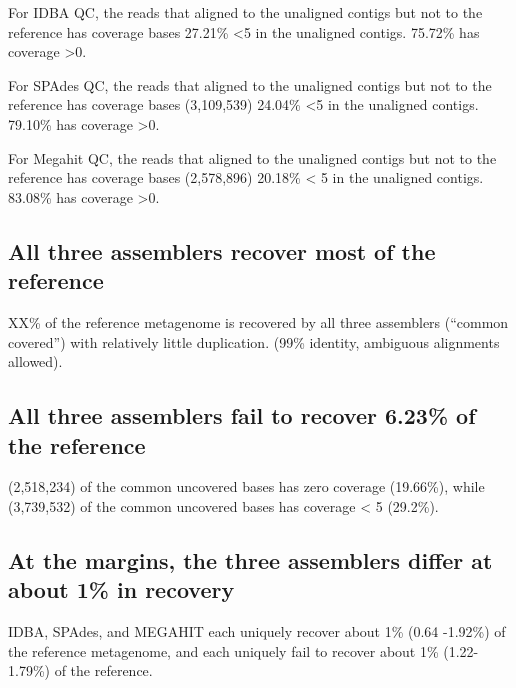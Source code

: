 \documentclass[10pt,a4paper,twocolumn]{article}
\begin{document}
 

For IDBA QC, the reads that aligned to the unaligned contigs but not
to the reference has coverage bases 27.21\% \textless 5 in the
unaligned contigs. 75.72\% has coverage \textgreater 0.

For SPAdes QC, the reads that aligned to the unaligned contigs but not
to the reference has coverage bases (3,109,539) 24.04\% \textless 5 in
the unaligned contigs. 79.10\% has coverage \textgreater 0.

For Megahit QC, the reads that aligned to the unaligned contigs but
not to the reference has coverage bases (2,578,896) 20.18\% \textless
5 in the unaligned contigs. 83.08\% has coverage \textgreater 0.

 

\subsection*{All three assemblers recover most of the reference}


XX\% of the reference metagenome is recovered by all three assemblers
(“common covered”) with relatively little duplication. (99\% identity,
ambiguous alignments allowed).
 
\subsection*{All three assemblers fail to recover 6.23\%  of the reference}
  

(2,518,234) of the common uncovered bases has zero coverage (19.66\%),
while (3,739,532) of the common uncovered bases has coverage \textless
5 (29.2\%).

\subsection*{At the margins, the three assemblers differ at about 1\% in recovery}
IDBA, SPAdes, and MEGAHIT each uniquely recover about 1\% (0.64
-1.92\%) of the reference metagenome, and each uniquely fail to
recover about 1\% (1.22-1.79\%) of the reference.
\end{document}

